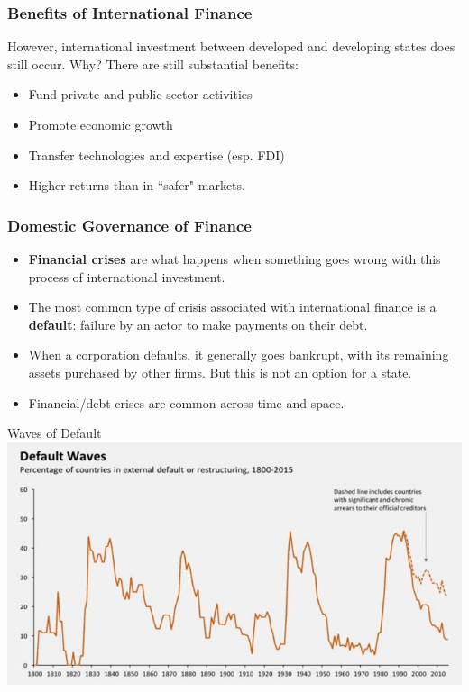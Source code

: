 \documentclass[handout]{beamer}
\begin{document}
\begin{frame} 
	\frametitle{\LARGE{Benefits of International Finance}}
However, international investment between developed and developing states does still occur. Why? There are still substantial benefits: \pause
	\begin{itemize}
			    \item Fund private and public sector activities \pause 
			    \item Promote economic growth \pause 
			    \item Transfer technologies and expertise (esp. FDI)  \pause
			    \item Higher returns than in ``safer" markets.		
	\end{itemize}
\end{frame}

\begin{frame} 
	\frametitle{\LARGE{Domestic Governance of Finance}}
	\begin{itemize}
			\item \textbf{Financial crises} are what happens when something goes wrong with this process of international investment. \pause
			\item The most common type of crisis associated with international finance is a \textbf{default}: failure by an actor to make payments on their debt. \pause
			\item When a corporation defaults, it generally goes bankrupt, with its remaining assets purchased by other firms. But this is not an option for a state.
			\item Financial/debt crises are common across time and space.
	\end{itemize}
\end{frame}

\begin{frame}{\LARGE Waves of Default}
    \centering
\includegraphics[width=\textwidth,height=0.8\textheight,keepaspectratio]{default waves.JPG}
\end{frame}
\end{document}
